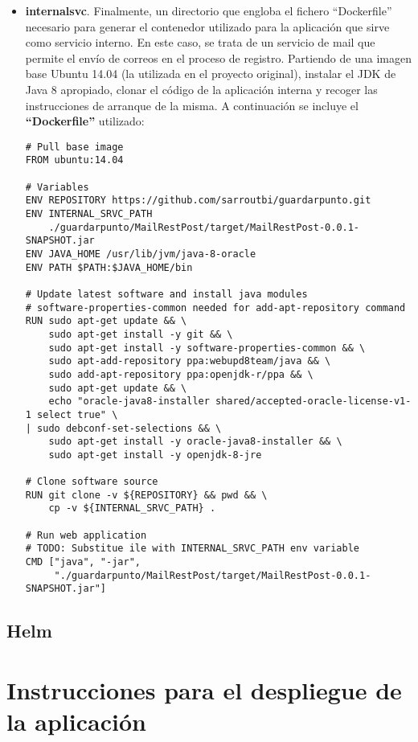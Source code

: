 \documentclass[12pt,spanish]{article}
\begin{document}
\begin{itemize}
\item{\textbf{internalsvc}}. Finalmente, un directorio que engloba el fichero ``Dockerfile'' necesario para generar el contenedor utilizado para la aplicación que sirve como servicio interno. En este caso, se trata de un servicio de mail que permite el envío de correos en el proceso de registro. Partiendo de una imagen base Ubuntu 14.04 (la utilizada en el proyecto original), instalar el JDK de Java 8 apropiado, clonar el código de la aplicación interna y recoger las instrucciones de arranque de la misma. A continuación se incluye el \textbf{``Dockerfile''} utilizado:
\begin{verbatim}
# Pull base image
FROM ubuntu:14.04

# Variables
ENV REPOSITORY https://github.com/sarroutbi/guardarpunto.git
ENV INTERNAL_SRVC_PATH
    ./guardarpunto/MailRestPost/target/MailRestPost-0.0.1-SNAPSHOT.jar
ENV JAVA_HOME /usr/lib/jvm/java-8-oracle
ENV PATH $PATH:$JAVA_HOME/bin

# Update latest software and install java modules
# software-properties-common needed for add-apt-repository command
RUN sudo apt-get update && \
    sudo apt-get install -y git && \
    sudo apt-get install -y software-properties-common && \
    sudo apt-add-repository ppa:webupd8team/java && \
    sudo add-apt-repository ppa:openjdk-r/ppa && \
    sudo apt-get update && \
    echo "oracle-java8-installer shared/accepted-oracle-license-v1-1 select true" \
| sudo debconf-set-selections && \
    sudo apt-get install -y oracle-java8-installer && \
    sudo apt-get install -y openjdk-8-jre

# Clone software source
RUN git clone -v ${REPOSITORY} && pwd && \
    cp -v ${INTERNAL_SRVC_PATH} .

# Run web application
# TODO: Substitue ile with INTERNAL_SRVC_PATH env variable
CMD ["java", "-jar",
     "./guardarpunto/MailRestPost/target/MailRestPost-0.0.1-SNAPSHOT.jar"]
\end{verbatim}

\end{itemize}

\subsection{Helm}

\section{Instrucciones para el despliegue de la aplicación}
\label{sec:instructions}
\end{document}

